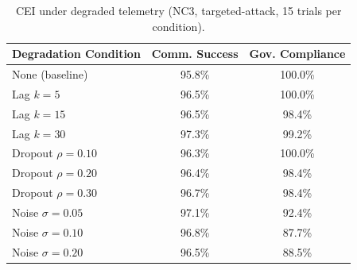 \documentclass[runningheads]{llncs}
\begin{document}
\begin{table}[ht]
\caption{CEI under degraded telemetry (NC3, targeted-attack, 15 trials per condition).}
\label{tab:telemetry}
\centering
\small
\begin{tabular}{lcc}
\toprule
Degradation Condition & Comm. Success & Gov. Compliance \\
\midrule
None (baseline)                  & 95.8\% & 100.0\% \\
Lag $k=5$                        & 96.5\% & 100.0\% \\
Lag $k=15$                       & 96.5\% &  98.4\% \\
Lag $k=30$                       & 97.3\% &  99.2\% \\
Dropout $\rho=0.10$              & 96.3\% & 100.0\% \\
Dropout $\rho=0.20$              & 96.4\% &  98.4\% \\
Dropout $\rho=0.30$              & 96.7\% &  98.4\% \\
Noise $\sigma=0.05$              & 97.1\% &  92.4\% \\
Noise $\sigma=0.10$              & 96.8\% &  87.7\% \\
Noise $\sigma=0.20$              & 96.5\% &  88.5\% \\
\bottomrule
\end{tabular}
\end{table}
\end{document}
